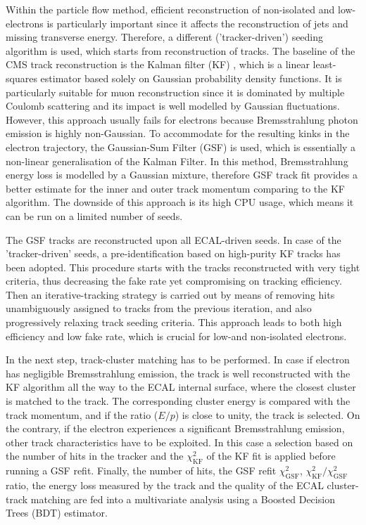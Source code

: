 Within the particle flow method, efficient reconstruction of non-isolated and low-\pt electrons is particularly
important since it affects the reconstruction of jets and missing transverse energy. Therefore, a different
('tracker-driven') seeding algorithm is used, which starts from reconstruction of tracks. The baseline of the CMS track
reconstruction is the Kalman filter (KF) \cite{KF}, which is a linear least-squares estimator based solely on Gaussian
probability density functions. It is particularly suitable for muon reconstruction since it is dominated by multiple
Coulomb scattering and its impact is well modelled by Gaussian fluctuations. However, this approach usually fails for
electrons because Bremsstrahlung photon emission is highly non-Gaussian. To accommodate for the resulting kinks in the
electron trajectory, the Gaussian-Sum Filter (GSF) \cite{GSF} is used, which is essentially a non-linear generalisation
of the Kalman Filter. In this method, Bremsstrahlung energy loss is modelled by a Gaussian mixture, therefore GSF track
fit provides a better estimate for the inner and outer track momentum comparing to the KF algorithm. The downside of
this approach is its high CPU usage, which means it can be run on a limited number of seeds.

The GSF tracks are reconstructed upon all ECAL-driven seeds. In case of the 'tracker-driven' seeds, a pre-identification
based on high-purity KF tracks has been adopted. This procedure starts with the tracks reconstructed with very tight
criteria, thus decreasing the fake rate yet compromising on tracking efficiency. Then an iterative-tracking strategy is
carried out by means of removing hits unambiguously assigned to tracks from the previous iteration, and also
progressively relaxing track seeding criteria. This approach leads to both high efficiency and low fake rate, which is
crucial for low-\pt and non-isolated electrons.

In the next step, track-cluster matching has to be performed. In case if electron has negligible Bremsstrahlung
emission, the track is well reconstructed with the KF algorithm all the way to the ECAL internal surface, where the
closest cluster is matched to the track. The corresponding cluster energy is compared with the track momentum, and if
the ratio ($E/p$) is close to unity, the track is selected. On the contrary, if the electron experiences a significant
Bremsstrahlung emission, other track characteristics have to be exploited. In this case a selection based on the number
of hits in the tracker and the $\chi^2_\textrm{KF}$ of the KF fit is applied before running a GSF refit. Finally, the
number of hits, the GSF refit $\chi^2_\textrm{GSF}$, $\chi^2_\textrm{KF}/\chi^2_\textrm{GSF}$ ratio, the energy loss
measured by the track and the quality of the ECAL cluster-track matching are fed into a multivariate analysis using a
Boosted Decision Trees (BDT) estimator.

